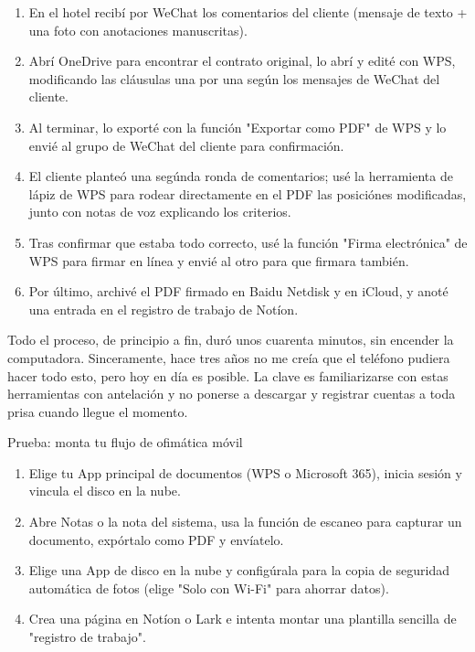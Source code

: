 \begin{enumerate}
  \item En el hotel recibí por WeChat los comentarios del cliente (mensaje de texto + una foto con anotaciones manuscritas).
  \item Abrí OneDrive para encontrar el contrato original, lo abrí y edité con WPS, modificando las cláusulas una por una según los mensajes de WeChat del cliente.
  \item Al terminar, lo exporté con la función "Exportar como PDF" de WPS y lo envié al grupo de WeChat del cliente para confirmación.
  \item El cliente planteó una segúnda ronda de comentarios; usé la herramienta de lápiz de WPS para rodear directamente en el PDF las posiciónes modificadas, junto con notas de voz explicando los criterios.
  \item Tras confirmar que estaba todo correcto, usé la función "Firma electrónica" de WPS para firmar en línea y envié al otro para que firmara también.
  \item Por último, archivé el PDF firmado en Baidu Netdisk y en iCloud, y anoté una entrada en el registro de trabajo de Notíon.
\end{enumerate}

Todo el proceso, de principio a fin, duró unos cuarenta minutos, sin encender la computadora. Sinceramente, hace tres años no me creía que el teléfono pudiera hacer todo esto, pero hoy en día es posible. La clave es familiarizarse con estas herramientas con antelación y no ponerse a descargar y registrar cuentas a toda prisa cuando llegue el momento.

\begin{tcbpractice}{Prueba: monta tu flujo de ofimática móvil}
\begin{enumerate}
  \item Elige tu App principal de documentos (WPS o Microsoft 365), inicia sesión y vincula el disco en la nube.
  \item Abre Notas o la nota del sistema, usa la función de escaneo para capturar un documento, expórtalo como PDF y envíatelo.
  \item Elige una App de disco en la nube y configúrala para la copia de seguridad automática de fotos (elige "Solo con Wi-Fi" para ahorrar datos).
  \item Crea una página en Notíon o Lark e intenta montar una plantilla sencilla de "registro de trabajo".
\end{enumerate}

\end{tcbpractice}
